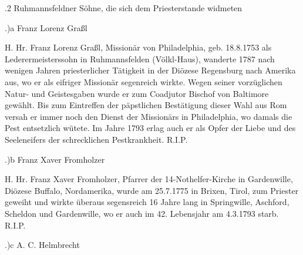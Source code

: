.2 Ruhmannsfeldner Söhne, die sich dem Priesterstande widmeten

.)a Franz Lorenz Graßl

H. Hr. Franz Lorenz Graßl, Missionär von Philadelphia, geb. 18.8.1753 als
Lederermeisterssohn in Ruhmannsfelden (Völkl-Haus), wanderte 1787 nach wenigen
Jahren priesterlicher Tätigkeit in der Diözese Regensburg nach Amerika aus, wo
er als eifriger Missionär segenreich wirkte. Wegen seiner vorzüglichen Natur-
und Geistesgaben wurde er zum Coadjutor Bischof von Baltimore gewählt. Bis zum
Eintreffen der päpstlichen Bestätigung dieser Wahl aus Rom versah er immer noch
den Dienst der Missionärs in Philadelphia, wo damals die Pest entsetzlich
wütete. Im Jahre 1793 erlag auch er als Opfer der Liebe und des Seeleneifers der
schrecklichen Pestkrankheit. R.I.P.

.)b Franz Xaver Fromholzer

H. Hr. Franz Xaver Fromholzer, Pfarrer der 14-Nothelfer-Kirche in Gardenwille,
Diözese Buffalo, Nordamerika, wurde am 25.7.1775 in Brixen, Tirol, zum Priester
geweiht und wirkte überaus segensreich 16 Jahre lang in Springwille, Aschford,
Scheldon und Gardenwille, wo er auch im 42. Lebensjahr am 4.3.1793 starb. R.I.P.

.)c A. C. Helmbrecht

